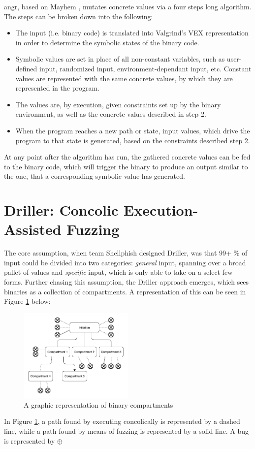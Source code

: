 \documentclass[a4paper]{article}
\newcommand{\tit}[1]{\textit{#1}}
\begin{document}
angr, based on Mayhem \cite{Mayhem}, mutates concrete values via a four
steps long algorithm. The steps can be broken down into the following:
\begin{itemize}
	\item[1] The input (i.e. binary code) is translated into Valgrind's VEX \cite{VEX} representation in order to determine the symbolic states of the binary code.
	\item[2] Symbolic values are set in place of all non-constant variables, such as user-defined input, randomized input, environment-dependant input, etc. Constant values are represented with the same concrete values, by which they are represented in the program.
	\item[3] The values are, by execution, given constraints set up by the binary environment, as well as the concrete values described in step 2.
	\item[4] When the program reaches a new path or state, input values, which drive the program to that state is generated, based on the constraints described step 2.
\end{itemize}
At any point after the algorithm has run, the gathered concrete values can be fed to the binary code, which will trigger the binary to produce an output similar to the one, that a corresponding symbolic value has generated.
\section{Driller: Concolic Execution-Assisted Fuzzing}
The core assumption, when team Shellphish designed Driller, was that 99+ \% of input could be divided into two categories: \tit{general} input, spanning over a broad pallet of values and \tit{specific} input, which is only able to take on a select few forms. Further chasing this assumption,  the Driller approach emerges, which sees binaries as a collection of compartments. A representation of this can be seen in Figure \ref{Compartments} below:\\
\begin{figure}[H]
	\centering
	\includegraphics[width=0.5\textwidth]{Compartments}
	\caption{A graphic representation of binary compartments}
	\label{Compartments}
\end{figure}
\noindent
In Figure \ref{Compartments}, a path found by executing concolically is represented by a dashed line, while a path found by means of fuzzing is represented by a solid line. A bug is represented by $\oplus$
\end{document}
